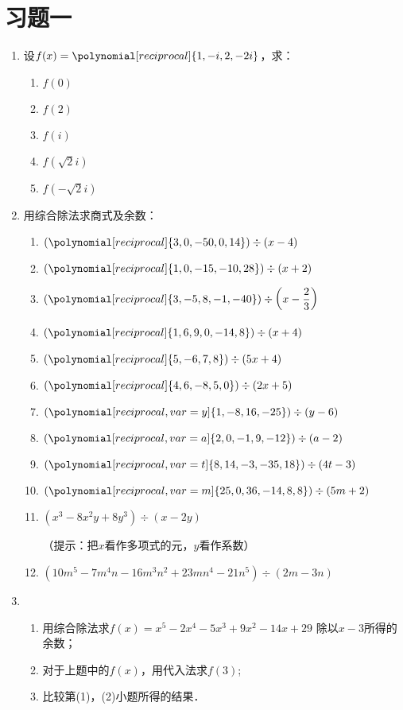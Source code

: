\section*{习题一}
\begin{enumerate}
    \item 设$f(x)=\polynomial[reciprocal]{1,-i,2,-2i}$，求：
\begin{multicols}{3}
\begin{enumerate}[(1)]
    \item $f(0)$
    \item $f(2)$
    \item $f(i)$
    \item $f\left(\sqrt{2}i\right)$
    \item $f\left(-\sqrt{2}i\right)$
\end{enumerate}
\end{multicols}

\item 用综合除法求商式及余数：
\begin{enumerate}[(1)]
    \item $(\polynomial[reciprocal]{3,0,-50,0,14})\div (x-4)$
    \item $(\polynomial[reciprocal]{1,0,-15,-10,28})\div (x+2)$
    \item $(\polynomial[reciprocal]{3,-5,8,-1,-40})\div \left(x-\frac{2}{3}\right)$
    \item $(\polynomial[reciprocal]{1,6,9,0,-14,8})\div (x+4)$
    \item $(\polynomial[reciprocal]{5,-6,7,8})\div (5x+4)$
    \item $(\polynomial[reciprocal]{4,6,-8,5,0})\div (2x+5)$
    \item $(\polynomial[reciprocal, var=y]{1,-8,16,-25})\div (y-6)$
    \item $(\polynomial[reciprocal, var=a]{2,0,-1,9,-12})\div (a-2)$
    \item $(\polynomial[reciprocal, var=t]{8,14,-3,-35,18})\div (4t-3)$
    \item $(\polynomial[reciprocal, var=m]{25,0,36,-14,8,8})\div (5m+2)$
    \item $(x^3-8x^2y+8y^3)\div (x-2y)$ 
    
    （提示：把$x$看作多项式的元，$y$看作系数）
    \item $(10m^5-7m^4n-16m^3n^2+23mn^4-21n^5)\div (2m-3n)$
\end{enumerate}

\item \begin{enumerate}[(1)]
    \item 用综合除法求$f(x)=x^5-2x^4-5x^3+9x^2-14x+29$
    除以$x-3$所得的余数；
    \item 对于上题中的$f(x)$，用代入法求$f(3)$;
    \item 比较第(1)，(2)小题所得的结果．
\end{enumerate}


\end{enumerate}

